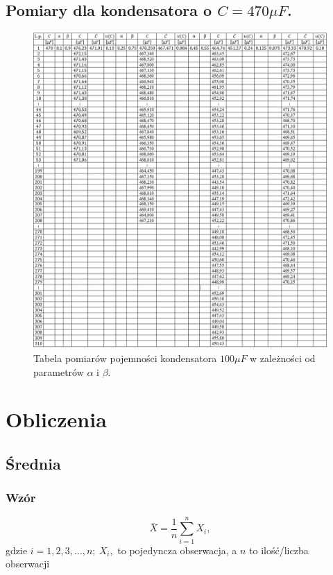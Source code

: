 \documentclass[12pt]{mwart}
\begin{document}
	\subsection{Pomiary dla kondensatora o $C=470\mu F$.}
	\begin{figure}[H]
		\centering
		\includegraphics[width=1\linewidth, height=.93\textheight]{470_tab.jpg}
		\caption{Tabela pomiarów pojemności kondensatora $100\mu F$ w zależności od parametrów $\alpha$ i $\beta$.}
	\end{figure}
	\section{Obliczenia}
	\subsection{Średnia}
	\subsubsection{Wzór}
	\begin{equation}
		\bar X = \frac{1}{n}\sum\limits_{i=1}^{n} X_{i},
	\end{equation}
	gdzie $i=1,2,3,\dots ,n; \ X_{i},$ to pojedyncza obserwacja, a $n$ to ilość/liczba obserwacji
\end{document}

